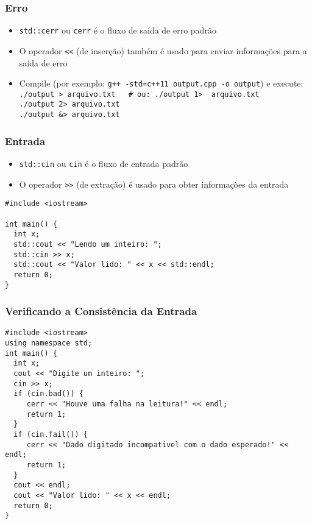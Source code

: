 \documentclass[aspectratio=169]{beamer}
\begin{document}
\begin{frame}[fragile]\frametitle{Erro}
\begin{itemize}
	\item \texttt{std::cerr} ou \texttt{cerr} é o fluxo de saída de erro padrão
	\item O operador \texttt{\textless{}\textless} (de inserção) também é usado para enviar informações para a saída de erro

	\item Compile (por exemplo: \texttt{g++ -std=c++11 output.cpp -o output}) e execute:\\
\texttt{./output \textgreater{} arquivo.txt ~ \# ou: ./output 1\textgreater ~ arquivo.txt}\\
\texttt{./output 2\textgreater{} arquivo.txt}\\
\texttt{./output \&\textgreater{} arquivo.txt}\\
\end{itemize}
\end{frame}

\begin{frame}[fragile]\frametitle{Entrada}
\begin{itemize}
	\item \texttt{std::cin} ou \texttt{cin} é o fluxo de entrada padrão
	\item O operador \texttt{\textgreater{}\textgreater} (de extração) é usado para obter informações da entrada
\end{itemize}
\begin{lstlisting}
#include <iostream>

int main() {
  int x;
  std::cout << "Lendo um inteiro: ";
  std::cin >> x;
  std::cout << "Valor lido: " << x << std::endl;
  return 0;
}
\end{lstlisting}
\end{frame}

\begin{frame}[fragile]\frametitle{Verificando a Consistência da Entrada}
\begin{lstlisting}[basicstyle=\ttfamily\scriptsize]
#include <iostream>
using namespace std;
int main() {
  int x;
  cout << "Digite um inteiro: ";
  cin >> x;
  if (cin.bad()) {
     cerr << "Houve uma falha na leitura!" << endl;
     return 1;
  }
  if (cin.fail()) {
     cerr << "Dado digitado incompativel com o dado esperado!" << endl;
     return 1;
  }
  cout << endl;
  cout << "Valor lido: " << x << endl;
  return 0;
}
\end{lstlisting}
\end{frame}
\end{document}
